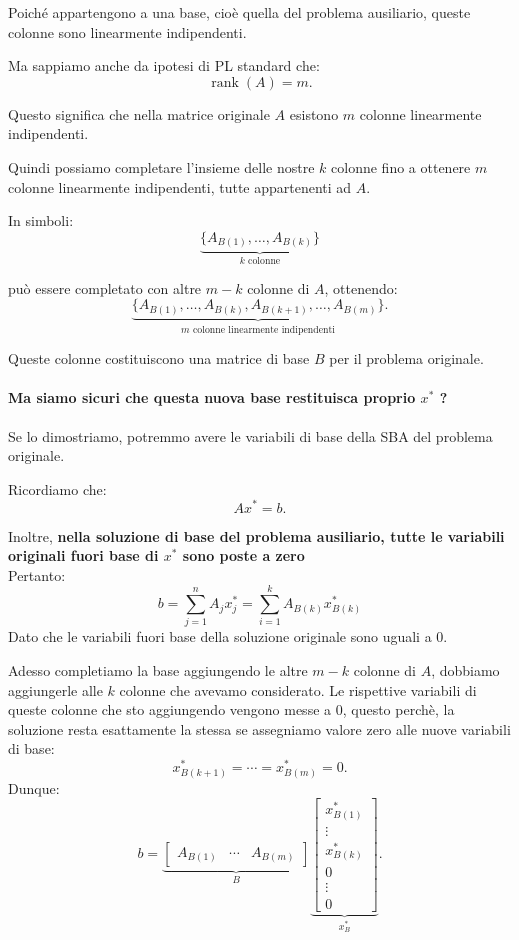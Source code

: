 Poiché appartengono a una base, cioè quella del problema ausiliario, queste colonne sono linearmente indipendenti.

Ma sappiamo anche da ipotesi di PL standard che:
\[
\operatorname{rank}(A)=m.
\]

Questo significa che nella matrice originale \(A\) esistono \(m\) colonne linearmente indipendenti.

Quindi possiamo completare l'insieme delle nostre \(k\) colonne fino a ottenere \(m\) colonne linearmente indipendenti, tutte appartenenti ad \(A\).

In simboli:
\[
\underbrace{
\{A_{B(1)},\ldots,A_{B(k)}\}
}_{k\text{ colonne}}
\]

può essere completato con altre \(m-k\) colonne di \(A\), ottenendo:
\[
\underbrace{
\{A_{B(1)},\ldots,A_{B(k)},
A_{B(k+1)},\ldots,A_{B(m)}\}
}_{m\text{ colonne linearmente indipendenti}}.
\]

Queste colonne costituiscono una matrice di base \(B\) per il problema originale.

\paragraph{Ma siamo sicuri che questa nuova base restituisca proprio \(x^*\) ?}
Se lo dimostriamo, potremmo avere le variabili di base della SBA del problema originale.

Ricordiamo che:
\[
Ax^*=b.
\]

Inoltre, \textbf{nella soluzione di base del problema ausiliario, tutte le variabili originali fuori base di $x^*$ sono poste a zero}
\\
Pertanto:
\[
b = \sum_{j = 1}^{n} A_j x^*_j = \sum_{i = 1}^{k} A_{B(k)}x^*_{B(k)}
\]
Dato che le variabili fuori base della soluzione originale sono uguali a 0.


Adesso completiamo la base aggiungendo le altre \(m-k\) colonne di \(A\), dobbiamo aggiungerle alle $k$ colonne che avevamo considerato.
Le rispettive variabili di queste colonne che sto aggiungendo vengono messe a 0, questo perchè, la soluzione resta esattamente la stessa se assegniamo valore zero alle nuove variabili di base:
\[
x_{B(k+1)}^*=\cdots=x_{B(m)}^*=0.
\]
Dunque:
\[
b=
\underbrace{
\begin{bmatrix}
A_{B(1)}&\cdots&A_{B(m)}
\end{bmatrix}
}_{B}
\underbrace{
\begin{bmatrix}
x_{B(1)}^*\\
\vdots\\
x_{B(k)}^*\\
0\\
\vdots\\
0
\end{bmatrix}
}_{x_B^*}.
\]

